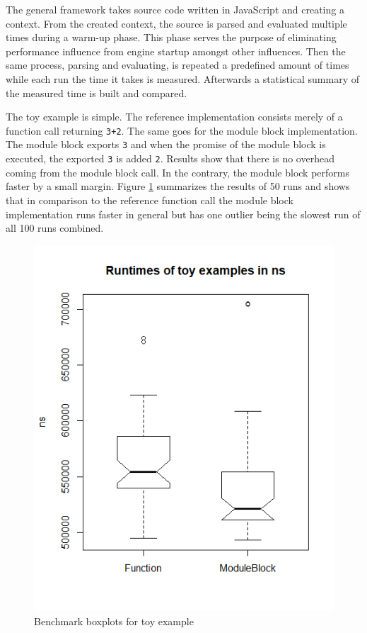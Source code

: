 The general framework takes source code written in JavaScript and creating a context. From the created context, the source is parsed and evaluated multiple times during a warm-up phase. This phase serves the purpose of eliminating performance influence from engine startup amongst other influences. Then the same process, parsing and evaluating, is repeated a predefined amount of times while each run the time it takes is measured. Afterwards a statistical summary of the measured time is built and compared.

The toy example is simple. The reference implementation consists merely of a function call returning \texttt{3+2}. The same goes for the module block implementation. The module block exports \texttt{3} and when the promise of the module block is executed, the exported \texttt{3} is added \texttt{2}. Results show that there is no overhead coming from the module block call. In the contrary, the module block performs faster by a small margin. Figure \ref{fig:bToy} summarizes the results of 50 runs and shows that in comparison to the reference function call the module block implementation runs faster in general but has one outlier being the slowest run of all 100 runs combined.

\begin{figure}[h!]
    \centering
    \includegraphics[scale=0.7]{figures/runtimesToyBoxplot.png}
    \caption{Benchmark boxplots for toy example}
    \label{fig:bToy}
\end{figure}

